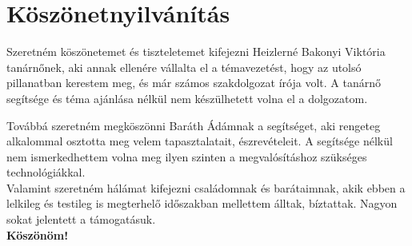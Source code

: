 \documentclass[a4paper,12pt]{report}
\begin{document}
\section{Köszönetnyilvánítás}
    Szeretném köszönetemet és tiszteletemet kifejezni Heizlerné Bakonyi Viktória tanárnőnek, aki annak ellenére vállalta el
    a témavezetést, hogy az utolsó pillanatban kerestem meg, és már számos szakdolgozat írója volt. A tanárnő segítsége és
    téma ajánlása nélkül nem készülhetett volna el a dolgozatom.

    Továbbá szeretném megköszönni Baráth Ádámnak a segítséget, aki rengeteg alkalommal osztotta meg velem tapasztalatait, észrevételeit.
    A segítsége nélkül nem ismerkedhettem volna meg ilyen szinten a megvalósításhoz szükséges technológiákkal.\\

    Valamint szeretném hálámat kifejezni családomnak és barátaimnak, akik ebben a lelkileg és testileg is megterhelő időszakban
    mellettem álltak, bíztattak. Nagyon sokat jelentett a támogatásuk.\\

    \textbf{Köszönöm!}
\end{document}
